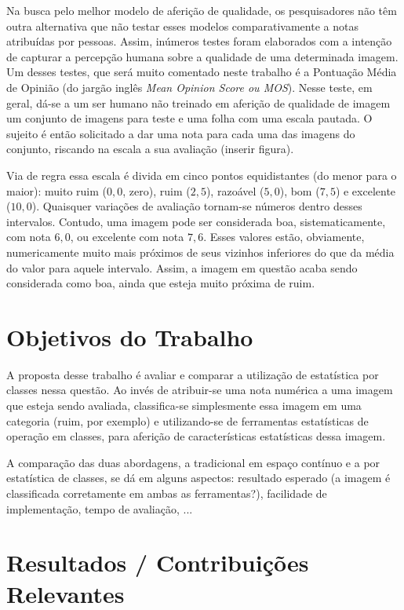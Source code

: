 \documentclass[a4paper]{book}
\begin{document}
	Na busca pelo melhor modelo de aferição de qualidade, os pesquisadores não têm outra alternativa que não testar esses modelos comparativamente a notas atribuídas por pessoas. Assim, inúmeros testes foram elaborados com a intenção de capturar a percepção humana sobre a qualidade de uma determinada imagem. Um desses testes, que será muito comentado neste trabalho é a Pontuação Média de Opinião (do jargão inglês {\em Mean Opinion Score ou MOS}). Nesse teste, em geral, dá-se a um ser humano não treinado em aferição de qualidade de imagem um conjunto de imagens para teste e uma folha com uma escala pautada. O sujeito é então solicitado a dar uma nota para cada uma das imagens do conjunto, riscando na escala a sua avaliação (inserir figura).

	Via de regra essa escala é divida em cinco pontos equidistantes (do menor para o maior): muito ruim ($0,0$, zero), ruim ($2,5$), razoável ($5,0$), bom ($7,5$) e excelente ($10,0$). Quaisquer variações de avaliação tornam-se números dentro desses intervalos. Contudo, uma imagem pode ser considerada boa, sistematicamente, com nota $6,0$, ou excelente com nota $7,6$. Esses valores estão, obviamente, numericamente muito mais próximos de seus vizinhos inferiores do que da média do valor para aquele intervalo. Assim, a imagem em questão acaba sendo considerada como boa, ainda que esteja muito próxima de ruim.

	\section{Objetivos do Trabalho}
	A proposta desse trabalho é avaliar e comparar a utilização de estatística por classes nessa questão. Ao invés de atribuir-se uma nota numérica a uma imagem que esteja sendo avaliada, classifica-se simplesmente essa imagem em uma categoria (ruim, por exemplo) e utilizando-se de ferramentas estatísticas de operação em classes, para aferição de características estatísticas dessa imagem.

	A comparação das duas abordagens, a tradicional em espaço contínuo e a por estatística de classes, se dá em alguns aspectos: resultado esperado (a imagem é classificada corretamente em ambas as ferramentas?), facilidade de implementação, tempo de avaliação, ...


	\section{Resultados / Contribuições Relevantes}
\end{document}
